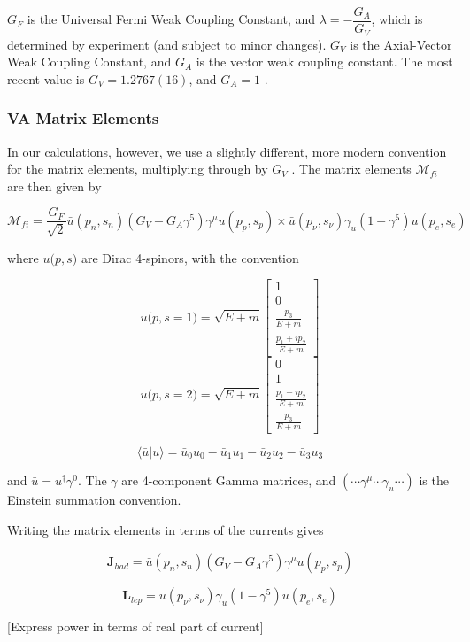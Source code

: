 \documentclass[%
 aip,
 jmp,%
 amsmath,amssymb,
 reprint,%
]{revtex4-1}
\begin{document}
$G_{F}$ is the Universal Fermi Weak Coupling Constant, and $\lambda=-\dfrac{G_{A}}{G_{V}}$, which is determined by experiment (and subject to minor changes). 
 $G_{V}$ is the Axial-Vector Weak Coupling Constant, and $G_{A}$ is the vector weak coupling
constant.  The most recent value is $G_{V}=1.2767(16)$, and $G_{A}=1$ \cite{vacoupling}.


\subsubsection{VA Matrix Elements}

In our calculations, however, we use a slightly different, more modern convention for the matrix elements, multiplying through by $G_{V}$ \cite{zuber}.   The matrix elements $\mathcal{M}_{fi}$ are then given by

$$\mathcal{M}_{fi}=\dfrac{G_{F}}{\sqrt{2}}\bar{u}(p_{n},s_{n})(G_{V}-G_{A}\gamma^{5})\gamma^{\mu}u(p_{p},s_{p})\times\bar{u}(p_{\nu},s_{\nu})\gamma_{u}(1-\gamma^{5})u(p_{e},s_{e})$$

where $u{(p},s)$ are Dirac 4-spinors, with the convention

$$u{(p},s=1)=\sqrt{E+m}\left[\begin{array}{c}
1\\
0\\
\frac{p_{3}}{E+m}\\
\frac{p_{1}+ip_{2}}{E+m}
\end{array}\right]$$
$$u{(p},s=2)=\sqrt{E+m}\left[\begin{array}{c}
0\\
1\\
\frac{p_{1}-ip_{2}}{E+m}\\
\frac{p_{3}}{E+m}
\end{array}\right]$$

$$\langle\bar{u}|u\rangle=\bar{u}_{0}u_{0}-\bar{u}_{1}u_{1}-\bar{u}_{2}u_{2}-\bar{u}_{3}u_{3}$$

and $\bar{u}=u^{\dagger}\gamma^{0}$.  The $\gamma$ are 4-component Gamma matrices, and  $(\cdots\gamma^{\mu}\cdots\gamma_{u}\cdots)$ is the Einstein summation convention. 

Writing the matrix elements in terms of the currents gives

$$\mathbf{J}_{had}=\bar{u}(p_{n},s_{n})(G_{V}-G_{A}\gamma^{5})\gamma^{\mu}u(p_{p},s_{p})$$

$$\mathbf{L}_{lep}=\bar{u}(p_{\nu},s_{\nu})\gamma_{u}(1-\gamma^{5})u(p_{e},s_{e})$$

[Express power in terms of real part of current]
\end{document}
